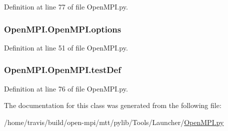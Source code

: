 Definition at line 77 of file Open\-M\-P\-I.\-py.

\hypertarget{class_open_m_p_i_1_1_open_m_p_i_a4a263774614f0b83a63a26639b46b2f5}{
\subsubsection[{options}]{\setlength{\rightskip}{0pt plus 5cm}Open\-M\-P\-I.\-Open\-M\-P\-I.\-options}}\label{class_open_m_p_i_1_1_open_m_p_i_a4a263774614f0b83a63a26639b46b2f5}


Definition at line 51 of file Open\-M\-P\-I.\-py.

\hypertarget{class_open_m_p_i_1_1_open_m_p_i_acd20b78013350c2363484589ef85b67c}{
\subsubsection[{test\-Def}]{\setlength{\rightskip}{0pt plus 5cm}Open\-M\-P\-I.\-Open\-M\-P\-I.\-test\-Def}}\label{class_open_m_p_i_1_1_open_m_p_i_acd20b78013350c2363484589ef85b67c}


Definition at line 76 of file Open\-M\-P\-I.\-py.



The documentation for this class was generated from the following file\-:\begin{DoxyCompactItemize}
\item 
/home/travis/build/open-\/mpi/mtt/pylib/\-Tools/\-Launcher/\hyperlink{_open_m_p_i_8py}{Open\-M\-P\-I.\-py}\end{DoxyCompactItemize}
